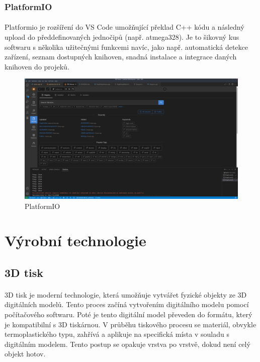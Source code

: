 \documentclass[12pt]{article}
\begin{document}
\begin{spacing}{1.5}
	\subsubsection*{PlatformIO}
	\paragraph{} Platformio je rozšíření do VS Code umožňující překlad C++ kódu a následný upload do předdefinovaných jednočipů (např. atmega328). Je to šikovný kus softwaru s několika užitečnými funkcemi navíc, jako např. automatická detekce zařízení, seznam dostupných knihoven, snadná instalace a integrace daných knihoven do projeků.
	
	\begin{figure}[H]
		\centering
		\includegraphics[width=\linewidth]{images/platformio.png}
		\caption{PlatformIO}
		\label{fig:platformio}
	\end{figure}
	
	\newpage
	\section{Výrobní technologie}
	\subsection{3D tisk}
	\paragraph{} 3D tisk je moderní technologie, která umožňuje vytvářet fyzické objekty ze 3D digitálních modelů. Tento proces začíná vytvořením digitálního modelu pomocí počítačového softwaru. Poté je tento digitální model převeden do formátu, který je kompatibilní s 3D tiskárnou. V průběhu tiskového procesu se materiál, obvykle termoplastického typu, zahřívá a aplikuje na specifická místa v souladu s digitálním modelem. Tento postup se opakuje vrstva po vrstvě, dokud není celý objekt hotov.
	

\end{spacing}
\end{document}

